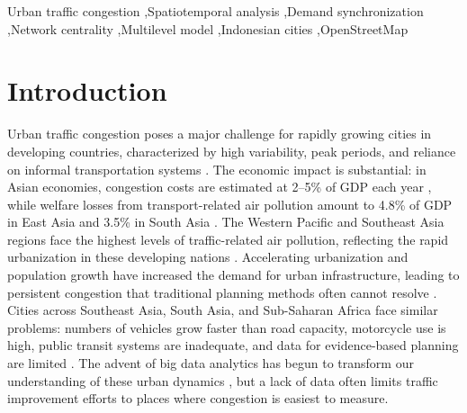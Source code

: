 \documentclass[review,authoryear]{elsarticle}
\begin{document}
\begin{frontmatter}
\begin{keyword}
Urban traffic congestion \sep Spatiotemporal analysis \sep Demand synchronization \sep Network centrality \sep Multilevel model \sep Indonesian cities \sep OpenStreetMap
\end{keyword}

\end{frontmatter}


\linenumbers

\section{Introduction}

Urban traffic congestion poses a major challenge for rapidly growing cities in developing countries, characterized by high variability, peak periods, and reliance on informal transportation systems \citep{Gakenheimer1999,Pojani2015}. The economic impact is substantial: in Asian economies, congestion costs are estimated at 2--5\% of GDP each year \citep{ADB2019}, while welfare losses from transport-related air pollution amount to 4.8\% of GDP in East Asia and 3.5\% in South Asia \citep{WorldBank2022}. The Western Pacific and Southeast Asia regions face the highest levels of traffic-related air pollution, reflecting the rapid urbanization in these developing nations \citep{WHO2021}. Accelerating urbanization and population growth have increased the demand for urban infrastructure, leading to persistent congestion that traditional planning methods often cannot resolve \citep{Cervero2013}. Cities across Southeast Asia, South Asia, and Sub-Saharan Africa face similar problems: numbers of vehicles grow faster than road capacity, motorcycle use is high, public transit systems are inadequate, and data for evidence-based planning are limited \citep{Pojani2015,Kutzbach2009}. The advent of big data analytics has begun to transform our understanding of these urban dynamics \citep{Batty2013}, but a lack of data often limits traffic improvement efforts to places where congestion is easiest to measure.
\end{document}
